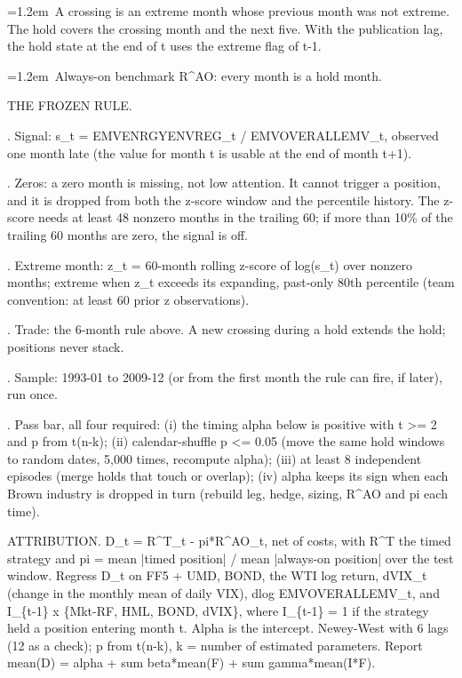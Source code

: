 \par\hangindent=1.2em\noindent\textbullet~A crossing is an extreme month whose previous month was not extreme. The hold covers the crossing month and the next five. With the publication lag, the hold state at the end of t uses the extreme flag of t-1.
\par\hangindent=1.2em\noindent\textbullet~Always-on benchmark R\^{}AO: every month is a hold month.
\medskip
\par\noindent THE FROZEN RULE.
\par{}. Signal: s\_t = EMVENRGYENVREG\_t / EMVOVERALLEMV\_t, observed one month late (the value for month t is usable at the end of month t+1).
\par{}. Zeros: a zero month is missing, not low attention. It cannot trigger a position, and it is dropped from both the z-score window and the percentile history. The z-score needs at least 48 nonzero months in the trailing 60; if more than 10\% of the trailing 60 months are zero, the signal is off.
\par{}. Extreme month: z\_t = 60-month rolling z-score of log(s\_t) over nonzero months; extreme when z\_t exceeds its expanding, past-only 80th percentile (team convention: at least 60 prior z observations).
\par{}. Trade: the 6-month rule above. A new crossing during a hold extends the hold; positions never stack.
\par{}. Sample: 1993-01 to 2009-12 (or from the first month the rule can fire, if later), run once.
\par{}. Pass bar, all four required: (i) the timing alpha below is positive with t \textgreater{}= 2 and p from t(n-k); (ii) calendar-shuffle p \textless{}= 0.05 (move the same hold windows to random dates, 5,000 times, recompute alpha); (iii) at least 8 independent episodes (merge holds that touch or overlap); (iv) alpha keeps its sign when each Brown industry is dropped in turn (rebuild leg, hedge, sizing, R\^{}AO and pi each time).
\medskip
\par\noindent ATTRIBUTION. D\_t = R\^{}T\_t - pi*R\^{}AO\_t, net of costs, with R\^{}T the timed strategy and pi = mean |timed position| / mean |always-on position| over the test window. Regress D\_t on FF5 + UMD, BOND, the WTI log return, dVIX\_t (change in the monthly mean of daily VIX), dlog EMVOVERALLEMV\_t, and I\_\{t-1\} x \{Mkt-RF, HML, BOND, dVIX\}, where I\_\{t-1\} = 1 if the strategy held a position entering month t. Alpha is the intercept. Newey-West with 6 lags (12 as a check); p from t(n-k), k = number of estimated parameters. Report mean(D) = alpha + sum beta*mean(F) + sum gamma*mean(I*F).
